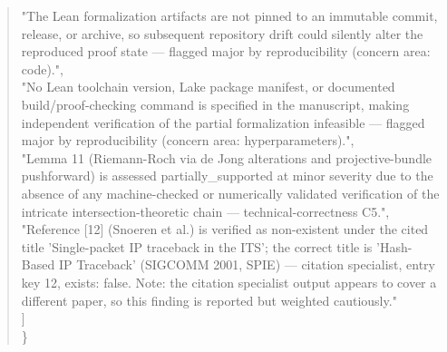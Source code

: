 \documentclass[11pt]{article}
\begin{document}
\begin{quote}
    "The Lean formalization artifacts are not pinned to an immutable commit, release, or archive, so subsequent repository drift could silently alter the reproduced proof state --- flagged major by reproducibility (concern area: code).",\\
    "No Lean toolchain version, Lake package manifest, or documented build/proof-checking command is specified in the manuscript, making independent verification of the partial formalization infeasible --- flagged major by reproducibility (concern area: hyperparameters).",\\
    "Lemma 11 (Riemann-Roch via de Jong alterations and projective-bundle pushforward) is assessed partially\_supported at minor severity due to the absence of any machine-checked or numerically validated verification of the intricate intersection-theoretic chain --- technical-correctness C5.",\\
    "Reference [12] (Snoeren et al.) is verified as non-existent under the cited title 'Single-packet IP traceback in the ITS'; the correct title is 'Hash-Based IP Traceback' (SIGCOMM 2001, SPIE) --- citation specialist, entry key 12, exists: false. Note: the citation specialist output appears to cover a different paper, so this finding is reported but weighted cautiously."\\
  ]\\
\}\\
\end{quote}
\end{document}
